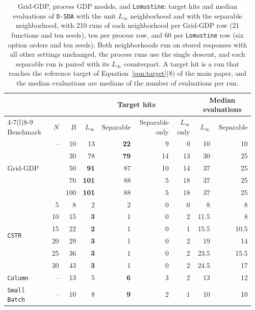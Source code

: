 \begin{table}[htbp]
\centering
\caption{Grid-GDP, process GDP models, and \texttt{Lomustine}: target hits and median evaluations of \texttt{D-SDA} with the unit \(L_\infty\) neighborhood and with the separable neighborhood, with 210 runs of each neighborhood per Grid-GDP row (21 functions and ten seeds), ten per process row, and 60 per \texttt{Lomustine} row (six option orders and ten seeds).
Both neighborhoods run on stored responses with all other settings unchanged, the process runs use the single descent, and each separable run is paired with its \(L_\infty\) counterpart.
A target hit is a run that reaches the reference target of Equation~\ifdefined\manuscriptwithsupplement\eqref{eqn:target}\else(8)\fi{} of the main paper, and the median evaluations are medians of the number of evaluations per run.}
\label{tab:supp-dsda-neighborhood}
\footnotesize
\begin{threeparttable}
\begin{tabular}{@{}lrrrrrrrr@{}}\toprule
 & & & \multicolumn{4}{c}{Target hits} & \multicolumn{2}{c}{Median evaluations}\\\cmidrule(lr){4-7}\cmidrule(l){8-9}
Benchmark & \(N\) & \(B\) & \(L_\infty\) & Separable & Separable only & \(L_\infty\) only & \(L_\infty\) & Separable \\\midrule
\multirow{5}{*}{Grid-GDP} & -- & 10 & 13 & \textbf{22} & 9 & 0 & 10 & 10 \\
 &  & 30 & 78 & \textbf{79} & 14 & 13 & 30 & 25 \\
 &  & 50 & \textbf{91} & 87 & 10 & 14 & 37 & 25 \\
 &  & 70 & \textbf{101} & 88 & 5 & 18 & 37 & 25 \\
 &  & 100 & \textbf{101} & 88 & 5 & 18 & 37 & 25 \\
\midrule
\multirow{6}{*}{\texttt{CSTR}} & 5 & 8 & 2 & 2 & 0 & 0 & 8 & 8 \\
 & 10 & 15 & \textbf{3} & 1 & 0 & 2 & 11.5 & 8 \\
 & 15 & 22 & \textbf{2} & 1 & 0 & 1 & 15.5 & 10.5 \\
 & 20 & 29 & \textbf{3} & 1 & 0 & 2 & 19 & 14 \\
 & 25 & 36 & \textbf{3} & 1 & 0 & 2 & 23.5 & 15.5 \\
 & 30 & 43 & \textbf{3} & 1 & 0 & 2 & 24.5 & 17 \\
\midrule
\texttt{Column} & -- & 13 & 5 & \textbf{6} & 3 & 2 & 13 & 12 \\
\midrule
\texttt{Small Batch} & -- & 10 & 8 & \textbf{9} & 2 & 1 & 10 & 10 \\

\end{tabular}
\end{threeparttable}
\end{table}
